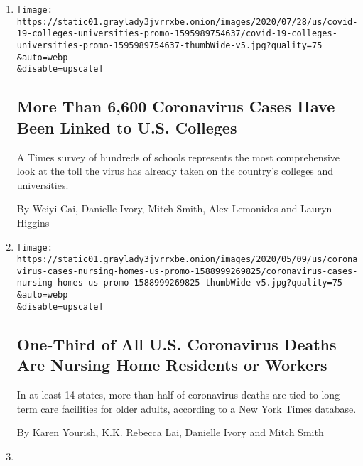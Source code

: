\begin{enumerate}
\def\labelenumi{\arabic{enumi}.}
\item
  \href{/interactive/2020/07/28/us/covid-19-colleges-universities.html}{}

  \texttt{[image: https://static01.graylady3jvrrxbe.onion/images/2020/07/28/us/covid-19-colleges-universities-promo-1595989754637/covid-19-colleges-universities-promo-1595989754637-thumbWide-v5.jpg?quality=75\\\&auto=webp\\\&disable=upscale]}

  \hypertarget{more-than-6600-coronavirus-cases-have-been-linked-to-us-colleges}{%
  \subsection{More Than 6,600 Coronavirus Cases Have Been Linked to U.S.
  Colleges}\label{more-than-6600-coronavirus-cases-have-been-linked-to-us-colleges}}

  A Times survey of hundreds of schools represents the most
  comprehensive look at the toll the virus has already taken on the
  country's colleges and universities.

  By Weiyi Cai, Danielle Ivory, Mitch Smith, Alex Lemonides and Lauryn
  Higgins
\item
  \href{/interactive/2020/05/09/us/coronavirus-cases-nursing-homes-us.html}{}

  \texttt{[image: https://static01.graylady3jvrrxbe.onion/images/2020/05/09/us/coronavirus-cases-nursing-homes-us-promo-1588999269825/coronavirus-cases-nursing-homes-us-promo-1588999269825-thumbWide-v5.jpg?quality=75\\\&auto=webp\\\&disable=upscale]}

  \hypertarget{one-third-of-all-us-coronavirus-deaths-are-nursing-home-residents-or-workers}{%
  \subsection{One-Third of All U.S. Coronavirus Deaths Are Nursing Home
  Residents or
  Workers}\label{one-third-of-all-us-coronavirus-deaths-are-nursing-home-residents-or-workers}}

  In at least 14 states, more than half of coronavirus deaths are tied
  to long-term care facilities for older adults, according to a New York
  Times database.

  By Karen Yourish, K.K. Rebecca Lai, Danielle Ivory and Mitch Smith
\item
  \href{/2020/04/17/us/coronavirus-nursing-homes.html}{}


\end{enumerate}
